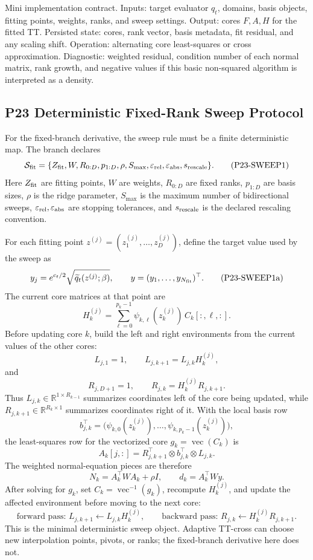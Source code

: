 \documentclass[11pt]{article}
\newcommand{\R}{\mathbb R}
\newcommand{\vecop}{\operatorname{vec}}
\begin{document}
Mini implementation contract.  Inputs: target evaluator \(q_t\), domains,
basis objects, fitting points, weights, ranks, and sweep settings.  Output:
cores \(F,A,H\) for the fitted TT.  Persisted state: cores, rank vector, basis
metadata, fit residual, and any scaling shift.  Operation: alternating core
least-squares or cross approximation.  Diagnostic: weighted residual, condition
number of each normal matrix, rank growth, and negative values if this basic
non-squared algorithm is interpreted as a density.

\subsection*{P23 Deterministic Fixed-Rank Sweep Protocol}

For the fixed-branch derivative, the sweep rule must be a finite deterministic
map.  The branch declares
\[
    \mathcal S_{\rm fit}
    =
    \{Z_{\rm fit},W,R_{0:D},p_{1:D},\rho,S_{\max},
      \varepsilon_{\rm rel},\varepsilon_{\rm abs},s_{\rm rescale}\}.
    \tag{P23-SWEEP1}
\]
Here \(Z_{\rm fit}\) are fitting points, \(W\) are weights, \(R_{0:D}\) are
fixed ranks, \(p_{1:D}\) are basis sizes, \(\rho\) is the ridge parameter,
\(S_{\max}\) is the maximum number of bidirectional sweeps,
\(\varepsilon_{\rm rel},\varepsilon_{\rm abs}\) are stopping tolerances, and
\(s_{\rm rescale}\) is the declared rescaling convention.

For each fitting point \(z^{(j)}=(z^{(j)}_1,\ldots,z^{(j)}_D)\), define the
target value used by the sweep as
\[
    y_j
    =
    e^{c_t/2}\sqrt{\widetilde q_t(z^{(j)};\beta)},
    \qquad
    y=(y_1,\ldots,y_{N_{\rm fit}})^\top.
    \tag{P23-SWEEP1a}
\]
The current core matrices at that point are
\[
    H_k^{(j)}
    =
    \sum_{\ell=0}^{p_k-1}
    \psi_{k,\ell}(z_k^{(j)})\,C_k[:,\ell,:].
    \tag{P23-SWEEP1b}
\]
Before updating core \(k\), build the left and right environments from the
current values of the other cores:
\[
    L_{j,1}=1,\qquad
    L_{j,k+1}=L_{j,k}H_k^{(j)},
    \tag{P23-SWEEP1c}
\]
and
\[
    R_{j,D+1}=1,\qquad
    R_{j,k}=H_k^{(j)}R_{j,k+1}.
    \tag{P23-SWEEP1d}
\]
Thus \(L_{j,k}\in\R^{1\times R_{k-1}}\) summarizes coordinates left of the
core being updated, while \(R_{j,k+1}\in\R^{R_k\times1}\) summarizes
coordinates right of it.  With the local basis row
\[
    b_{j,k}^\top
    =
    \bigl(\psi_{k,0}(z_k^{(j)}),\ldots,
    \psi_{k,p_k-1}(z_k^{(j)})\bigr),
    \tag{P23-SWEEP1e}
\]
the least-squares row for the vectorized core \(g_k=\vecop(C_k)\) is
\[
    A_k[j,:]
    =
    R_{j,k+1}^{\top}\otimes b_{j,k}^\top\otimes L_{j,k}.
    \tag{P23-SWEEP1f}
\]
The weighted normal-equation pieces are therefore
\[
    N_k=A_k^\top W A_k+\rho I,
    \qquad
    d_k=A_k^\top W y.
    \tag{P23-SWEEP1g}
\]
After solving for \(g_k\), set \(C_k=\vecop^{-1}(g_k)\), recompute
\(H_k^{(j)}\), and update the affected environment before moving to the next
core:
\[
    \text{forward pass: }L_{j,k+1}\leftarrow L_{j,k}H_k^{(j)},
    \qquad
    \text{backward pass: }R_{j,k}\leftarrow H_k^{(j)}R_{j,k+1}.
    \tag{P23-SWEEP1h}
\]
This is the minimal deterministic sweep object.  Adaptive TT-cross can choose
new interpolation points, pivots, or ranks; the fixed-branch derivative here
does not.
\end{document}
